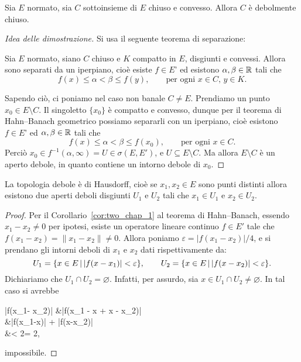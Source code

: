 \begin{theorem}
	Sia $E$ normato, sia $C$ sottoinsieme di $E$ chiuso e convesso.
	Allora $C$ è debolmente chiuso.
\end{theorem}
\begin{proof}[Idea delle dimostrazione]
	Si usa il seguente teorema di separazione:
	\begin{theorem}
	\label{th:geom_hahn_banach}
		Sia $E$ normato, siano $C$ chiuso e $K$ compatto in $E$, disgiunti e convessi.
		Allora sono separati da un iperpiano, cioè esiste $f \in E$' ed esistono $\alpha, \beta \in \mathbb{R}$ tali che
		\begin{equation*}
			f(x) \leq \alpha < \beta \leq f(y), \qquad \text{per ogni $x \in C$, $y \in K$.}
		\end{equation*}
	\end{theorem}
	Sapendo ciò, ci poniamo nel caso non banale $C \neq E$. Prendiamo un punto $x_0 \in E \setminus C$. Il singoletto $\{x_0\}$ è compatto e convesso, dunque per il teorema di Hahn--Banach geometrico possiamo separarli con un iperpiano, cioè esistono $f \in E$' ed $\alpha, \beta \in \mathbb{R}$ tali che
	\begin{equation*}
		f(x) \leq \alpha < \beta \leq f(x_0), \qquad \text{per ogni $x \in C$}.
	\end{equation*}
	Perciò $x_0 \in f^{-1}(\alpha, \infty) = U \in \sigma(E, E')$, e $U \subseteq E \setminus C$. Ma allora $E \setminus C$ è un aperto debole, in quanto contiene un intorno debole di $x_0$.
\end{proof}

\begin{lemma}
	La topologia debole è di Hausdorff, cioè se $x_1, x_2 \in E$ sono punti distinti allora esistono due aperti deboli disgiunti $U_1$ e $U_2$ tali che $x_1 \in U_1$ e $x_2 \in U_2$.
\end{lemma}
\begin{proof}
	Per il Corollario~\ref{cor:two_chap_1} al teorema di Hahn--Banach, essendo $x_1 - x_2 \neq 0$ per ipotesi, esiste un operatore lineare continuo $f \in E'$ tale che $f(x_1 - x_2) = \|x_1 - x_2\| \neq 0$. Allora poniamo $\varepsilon = |f(x_1-x_2)|/4$, e si prendano gli intorni deboli di $x_1$ e $x_2$ dati rispettivamente da:
	\begin{equation*}
		U_1 = \{x \in E \,|\, |f(x-x_1)| < \varepsilon \}, \qquad U_2 = \{x \in E \,|\, |f(x-x_2)| < \varepsilon \}.
	\end{equation*}
	Dichiariamo che $U_1 \cap U_2 = \varnothing$. Infatti, per assurdo, sia $x \in U_1 \cap U_2 \neq \varnothing$. In tal caso si avrebbe
	\begin{eqalign*}
		|f(x_1- x_2)| &\leq |f(x_1 - x + x - x_2)|\\
		&\leq |f(x_1-x)| + |f(x-x_2)|\\
		&< 2\varepsilon = 2,
	\end{eqalign*}
	impossibile.
\end{proof}

